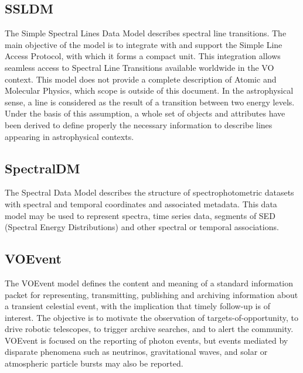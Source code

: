 \documentclass[11pt,a4paper]{ivoa}
\begin{document}
\subsection{SSLDM}

The Simple Spectral Lines Data Model describes spectral line transitions. The main objective of 
the model is to integrate with and support the Simple Line Access Protocol, with which it forms 
a compact unit. This integration allows seamless access to Spectral Line Transitions available 
worldwide in the VO context. This model does not provide a complete description of Atomic and 
Molecular Physics, which scope is outside of this document. In the astrophysical sense, a line 
is considered as the result of a transition between two energy levels. Under the basis of this 
assumption, a whole set of objects and attributes have been derived to define properly the 
necessary information to describe lines appearing in astrophysical contexts.

\subsection{SpectralDM}

The Spectral Data Model describes the structure of spectrophotometric datasets with spectral and 
temporal coordinates and associated metadata. This data model may be used to represent spectra, 
time series data, segments of SED (Spectral Energy Distributions) and other spectral or temporal 
associations. 

\subsection{VOEvent} 

The VOEvent model defines the content and meaning of a standard information packet for 
representing, transmitting, publishing and archiving information about a transient celestial 
event, with the implication that timely follow-up is of interest. The objective is to motivate 
the observation of targets-of-opportunity, to drive robotic telescopes, to trigger archive 
searches, and to alert the community. VOEvent is focused on the reporting of photon events, 
but events mediated by disparate phenomena such as neutrinos, gravitational waves, and solar 
or atmospheric particle bursts may also be reported.
\end{document}
